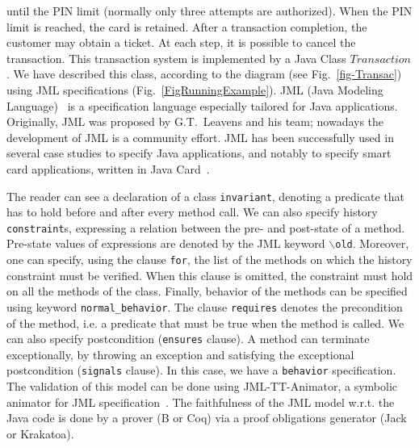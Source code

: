 until the PIN limit (normally only three at\-tem\-pts are authorized). When
the PIN lim\-it is reached, the card is retained. 
After a transaction completion, the customer may obtain a ticket. 
At each step, it is possible to cancel the transaction.
This transaction system is implemented by a Java Class $Transaction$.
We have 
described this class, according to the diagram (see Fig.~\ref{fig-Transac})
using JML specifications (Fig.~\ref{FigRunningExample}).
JML (Java Modeling
Language)~\cite{Leavens-etal03} is a specification
language especially tailored for Java applications. Originally, JML
was proposed by G.T.~Lea\-vens and his team; nowadays the development of
JML is a community effort. JML has been successfully used in several
case studies to specify Java applications, and notably to specify
smart card applications, written in Java
Card~\cite{BreunesseCHJ03,BousquetLMOL04,JacobsMR04}.



The reader can see a declaration of a class \texttt{invariant}, denoting a
predicate that has to hold before and after every method call.  We can also
specify history \texttt{constraint}s, expressing a relation between the
pre- and post-state of a method. Pre-state values of expressions are
denoted by the JML keyword \texttt{$\backslash$old}. Moreover, one can
specify, using the clause \texttt{for}, the list of the methods on which
the history constraint must be verified. When this clause is omitted, the
constraint must hold on all the methods of the class.  Finally, behavior of
the methods can be specified using keyword \texttt{normal\_behavior}. The
clause \texttt{requires} denotes the precondition of the method, i.e.  a
predicate that must be true when the method is called. We can also specify
postcondition (\texttt{ensures} clause).  A method can terminate
exceptionally, by throwing an exception and satisfying the exceptional
postcondition (\texttt{signals} clause). In this case, we have a
\texttt{behavior} specification. The validation of this model can be done
using JML-TT-Animator, a symbolic animator for JML
specification~\cite{bdlu05}. The faithfulness of the JML model w.r.t. the
Java code is done by a prover (B or Coq) via a proof
obligations generator (Jack or Krakatoa). 
 


